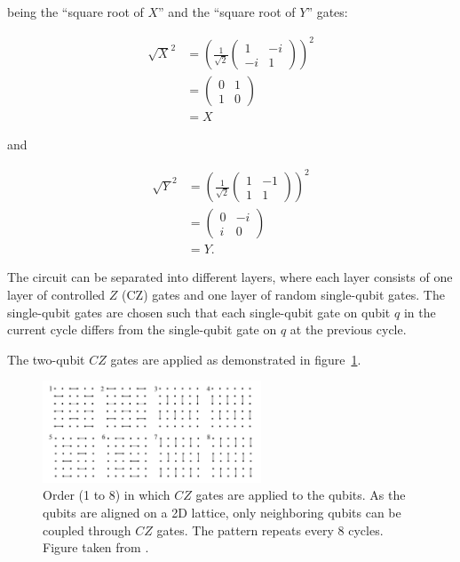 being the ``square root of $X$'' and the ``square root of $Y$'' gates:

\begin{align}
  \sqrt{X}^2 &= \left(\frac{1}{\sqrt{2}} \begin{pmatrix}
    1 & - i \\
    - i & 1
  \end{pmatrix}\right)^2 \\
  &= \begin{pmatrix}
    0 & 1 \\
    1 & 0
  \end{pmatrix} \\
  &= X
\end{align}

and

\begin{align}
  \sqrt{Y}^2 &= \left(\frac{1}{\sqrt{2}} \begin{pmatrix}
    1 & -1 \\
    1 & 1
  \end{pmatrix}\right)^2 \\
  &= \begin{pmatrix}
    0 & -i \\
    i & 0
  \end{pmatrix} \\
  &= Y.
\end{align}

The circuit can be separated into different layers, where each layer consists of one
layer of controlled $Z$ (CZ) gates and one layer of random single-qubit gates. The single-qubit
gates are chosen such that each single-qubit gate on qubit $q$ in the current
cycle differs from the single-qubit gate on $q$ at the previous cycle.

The two-qubit $CZ$ gates are applied as demonstrated in figure~\ref{fig:czgates}.

\begin{figure}[H]
  \centering
  \includegraphics[width=0.58\textwidth]{figures/cz_order}
  \caption[Order of $CZ$ Gate Applications in Random Circuits]{Order (1 to 8) in which $CZ$ gates are applied to the qubits. As 
  the qubits are aligned on a 2D lattice, only neighboring qubits can be coupled through $CZ$ gates. 
  The pattern repeats every 8 cycles. Figure taken from \cite{Boixo2018supremacy}.}
  \label{fig:czgates}
\end{figure}

